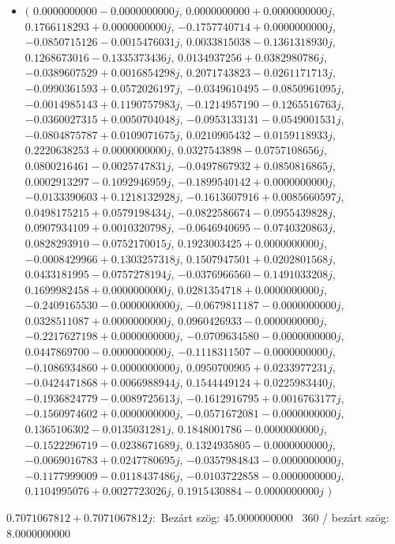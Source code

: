 \documentclass[14pt,a4paper]{article}
\begin{document}
\begin{itemize}
\item
$\big($
$0.0000000000-0.0000000000j$, $0.0000000000+0.0000000000j$, $0.1766118293+0.0000000000j$, $-0.1757740714+0.0000000000j$, $-0.0850715126-0.0015476031j$, $0.0033815038-0.1361318930j$, $0.1268673016-0.1335373436j$, $0.0134937256+0.0382980786j$, $-0.0389607529+0.0016854298j$, $0.2071743823-0.0261171713j$, $-0.0990361593+0.0572026197j$, $-0.0349610495-0.0850961095j$, $-0.0014985143+0.1190757983j$, $-0.1214957190-0.1265516763j$, $-0.0360027315+0.0050704048j$, $-0.0953133131-0.0549001531j$, $-0.0804875787+0.0109071675j$, $0.0210905432-0.0159118933j$, $0.2220638253+0.0000000000j$, $0.0327543898-0.0757108656j$, $0.0800216461-0.0025747831j$, $-0.0497867932+0.0850816865j$, $0.0002913297-0.1092946959j$, $-0.1899540142+0.0000000000j$, $-0.0133390603+0.1218132928j$, $-0.1613607916+0.0085660597j$, $0.0498175215+0.0579198434j$, $-0.0822586674-0.0955439828j$, $0.0907934109+0.0010320798j$, $-0.0646940695-0.0740320863j$, $0.0828293910-0.0752170015j$, $0.1923003425+0.0000000000j$, $-0.0008429966+0.1303257318j$, $0.1507947501+0.0202801568j$, $0.0433181995-0.0757278194j$, $-0.0376966560-0.1491033208j$, $0.1699982458+0.0000000000j$, $0.0281354718+0.0000000000j$, $-0.2409165530-0.0000000000j$, $-0.0679811187-0.0000000000j$, $0.0328511087+0.0000000000j$, $0.0960426933-0.0000000000j$, $-0.2217627198+0.0000000000j$, $-0.0709634580-0.0000000000j$, $0.0447869700-0.0000000000j$, $-0.1118311507-0.0000000000j$, $-0.1086934860+0.0000000000j$, $0.0950700905+0.0233977231j$, $-0.0424471868+0.0066988944j$, $0.1544449124+0.0225983440j$, $-0.1936824779-0.0089725613j$, $-0.1612916795+0.0016763177j$, $-0.1560974602+0.0000000000j$, $-0.0571672081-0.0000000000j$, $0.1365106302-0.0135031281j$, $0.1848001786-0.0000000000j$, $-0.1522296719-0.0238671689j$, $0.1324935805-0.0000000000j$, $-0.0069016783+0.0247780695j$, $-0.0357984843-0.0000000000j$, $-0.1177999009-0.0118437486j$, $-0.0103722858-0.0000000000j$, $0.1104995076+0.0027723026j$, $0.1915430884-0.0000000000j$
$\big)$
\end{itemize}
$0.7071067812+0.7071067812j$:\
Bezárt szög: $45.0000000000$ \
360 / bezárt szög: $8.0000000000$\
\end{document}
